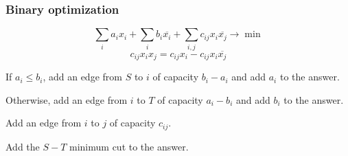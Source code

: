 \subsubsection*{Binary optimization}
\[\sum_i a_i x_i + \sum_i b_i \overline{x_i} + \sum_{i, j} c_{i j} x_i \overline{x_j} \to \min\]
\[c_{i j} x_i x_j = c_{i j} x_i - c_{i j} x_i \overline{x_j}\]

If $a_i \le b_i$,
add an edge from $S$ to $i$ of capacity $b_i - a_i$
and add $a_i$ to the answer.

Otherwise,
add an edge from $i$ to $T$ of capacity $a_i - b_i$
and add $b_i$ to the answer.

Add an edge from $i$ to $j$ of capacity $c_{i j}$.

Add the $S-T$ minimum cut to the answer.
